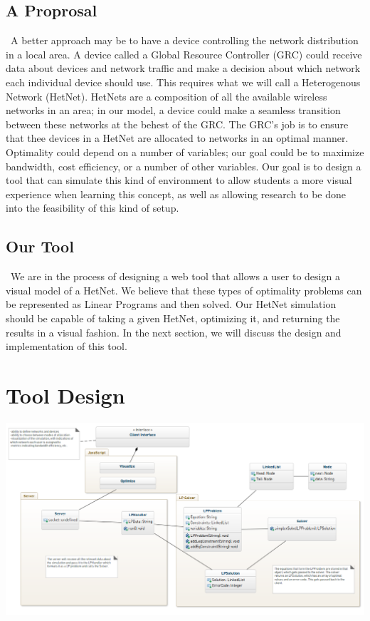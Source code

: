 \documentclass[11pt]{article}
\begin{document}
\subsection{A Proprosal}
~\indent A better approach may be to have a device controlling the network distribution
in a local area. A device called a Global Resource Controller (GRC) could receive
data about devices and network traffic and make a decision about which network
each individual device should use. This requires what we will call a Heterogenous 
Network (HetNet). HetNets are a composition of all the available wireless 
networks in an area; in our model, a device could make a seamless transition
between these networks at the behest of the GRC. The GRC's job is to ensure 
that thee devices in a HetNet are allocated to networks in an optimal manner.
Optimality could depend on a number of variables; our goal could be to maximize
bandwidth, cost efficiency, or a number of other variables. Our goal is 
to design a tool that can simulate this kind of environment to allow students 
a more visual experience when learning this concept, as well as allowing research
to be done into the feasibility of this kind of setup.

\subsection{Our Tool}
~\indent We are in the process of designing a web tool that allows a user to design a 
visual model of a HetNet. We believe that these types of optimality problems
can be represented as Linear Programs and then solved. Our HetNet simulation
should be capable of taking a given HetNet, optimizing it, and returning the 
results in a visual fashion. In the next section, we will discuss the 
design and implementation of this tool.


\section{Tool Design}

\begin{center}
\includegraphics[width=600px, angle=270]{model.png}
\end{center}
\end{document}
